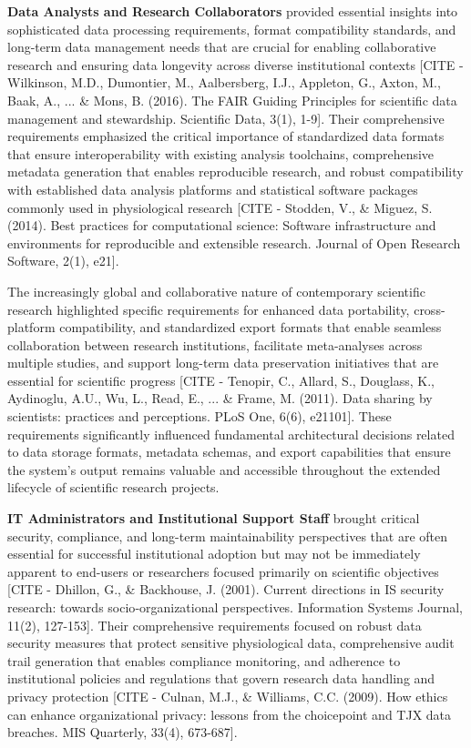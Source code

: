 \documentclass[12pt,a4paper]{article}
\begin{document}
\textbf{Data Analysts and Research Collaborators} provided essential insights into sophisticated data processing
requirements, format compatibility standards, and long-term data management needs that are crucial for enabling
collaborative research and ensuring data longevity across diverse institutional
contexts [CITE - Wilkinson, M.D., Dumontier, M., Aalbersberg, I.J., Appleton, G., Axton, M., Baak, A., ... \& Mons, B. (2016). The FAIR Guiding Principles for scientific data management and stewardship. Scientific Data, 3(1), 1-9].
Their comprehensive requirements emphasized the critical importance of standardized data formats that ensure
interoperability with existing analysis toolchains, comprehensive metadata generation that enables reproducible
research, and robust compatibility with established data analysis platforms and statistical software packages commonly
used in physiological
research [CITE - Stodden, V., \& Miguez, S. (2014). Best practices for computational science: Software infrastructure and environments for reproducible and extensible research. Journal of Open Research Software, 2(1), e21].

The increasingly global and collaborative nature of contemporary scientific research highlighted specific requirements
for enhanced data portability, cross-platform compatibility, and standardized export formats that enable seamless
collaboration between research institutions, facilitate meta-analyses across multiple studies, and support long-term
data preservation initiatives that are essential for scientific
progress [CITE - Tenopir, C., Allard, S., Douglass, K., Aydinoglu, A.U., Wu, L., Read, E., ... \& Frame, M. (2011). Data sharing by scientists: practices and perceptions. PLoS One, 6(6), e21101].
These requirements significantly influenced fundamental architectural decisions related to data storage formats,
metadata schemas, and export capabilities that ensure the system's output remains valuable and accessible throughout the
extended lifecycle of scientific research projects.

\textbf{IT Administrators and Institutional Support Staff} brought critical security, compliance, and long-term
maintainability perspectives that are often essential for successful institutional adoption but may not be immediately
apparent to end-users or researchers focused primarily on scientific
objectives [CITE - Dhillon, G., \& Backhouse, J. (2001). Current directions in IS security research: towards socio‐organizational perspectives. Information Systems Journal, 11(2), 127-153].
Their comprehensive requirements focused on robust data security measures that protect sensitive physiological data,
comprehensive audit trail generation that enables compliance monitoring, and adherence to institutional policies and
regulations that govern research data handling and privacy
protection [CITE - Culnan, M.J., \& Williams, C.C. (2009). How ethics can enhance organizational privacy: lessons from the choicepoint and TJX data breaches. MIS Quarterly, 33(4), 673-687].
\end{document}
